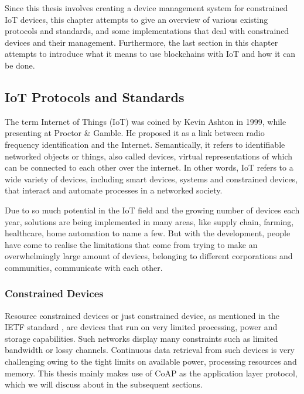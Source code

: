 \documentclass[english]{tktltiki}
\begin{document}
Since this thesis involves creating a device management system for constrained IoT devices, this chapter attempts to give an overview of various existing protocols and standards, and some implementations that deal with constrained devices and their management. Furthermore, the last section in this chapter attempts to introduce what it means to use blockchains with IoT and how it can be done.



\subsection{IoT Protocols and Standards}

The term Internet of Things (IoT) was coined by Kevin Ashton in 1999, while presenting at Proctor \& Gamble. He proposed it as a link between radio frequency identification and the Internet\cite{ashton}. Semantically, it refers to identifiable networked objects or things, also called devices, virtual representations of which can be connected to each other over the internet. In other words, IoT refers to a wide variety of devices, including smart devices, systems and constrained devices, that interact and automate processes in a networked society. 

Due to so much potential in the IoT field and the growing number of devices each year, solutions are being implemented in many areas, like supply chain, farming, healthcare, home automation to name a few. But with the development, people have come to realise the limitations that come from trying to make an overwhelmingly large amount of devices, belonging to different corporations and communities, communicate with each other.

\subsubsection*{Constrained Devices}

Resource constrained devices or just constrained device, as mentioned in the IETF standard \cite{constrained}, are devices that run on very limited processing, power and storage capabilities. Such networks display many constraints such as limited bandwidth or lossy channels. Continuous data retrieval from such devices is very challenging owing to the tight limits on available power, processing resources and memory. This thesis mainly makes use of CoAP as the application layer protocol, which we will discuss about in the subsequent sections.
\end{document}
